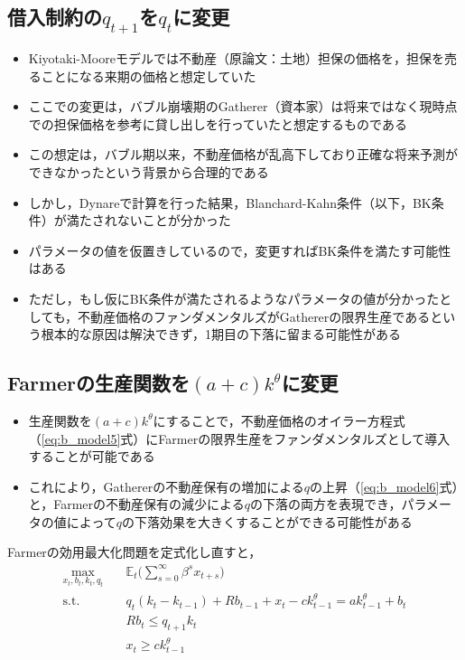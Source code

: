 \documentclass[dvipdfmx]{jlreq}
\begin{document}
\subsection{借入制約の$q_{t+1}$を$q_t$に変更} \label{q_change}
\begin{itemize}
  \item Kiyotaki-Mooreモデルでは不動産（原論文：土地）担保の価格を，担保を売ることになる来期の価格と想定していた
  \item ここでの変更は，バブル崩壊期のGatherer（資本家）は将来ではなく現時点での担保価格を参考に貸し出しを行っていたと想定するものである
  \item この想定は，バブル期以来，不動産価格が乱高下しており正確な将来予測ができなかったという背景から合理的である
  \item しかし，Dynareで計算を行った結果，Blanchard-Kahn条件（以下，BK条件）が満たされないことが分かった
  \item パラメータの値を仮置きしているので，変更すればBK条件を満たす可能性はある
  \item ただし，もし仮にBK条件が満たされるようなパラメータの値が分かったとしても，不動産価格のファンダメンタルズがGathererの限界生産であるという根本的な原因は解決できず，1期目の下落に留まる可能性がある
\end{itemize}

\subsection{Farmerの生産関数を$(a+c)k^\theta$に変更} \label{product_change}
\begin{itemize}
  \item 生産関数を$(a+c)k^\theta$にすることで，不動産価格のオイラー方程式（\eqref{eq:b_model5}式）にFarmerの限界生産をファンダメンタルズとして導入することが可能である
  \item これにより，Gathererの不動産保有の増加による$q$の上昇（\eqref{eq:b_model6}式）と，Farmerの不動産保有の減少による$q$の下落の両方を表現でき，パラメータの値によって$q$の下落効果を大きくすることができる可能性がある
\end{itemize}

Farmerの効用最大化問題を定式化し直すと，
\begin{align}
  \max_{x_t, b_t, k_t, q_t} \quad & \mathbb{E}_t \bigg( \sum_{s=0}^{\infty} \beta^s x_{t+s} \bigg) \\
  \text{s.t.} \quad & q_t(k_t - k_{t-1}) + R b_{t-1} + x_t - c k_{t-1}^\theta = a k_{t-1}^\theta + b_t \\
  & R b_t \leq q_{t+1} k_t \\
  & x_t \geq c k_{t-1}^\theta
\end{align}
\end{document}
